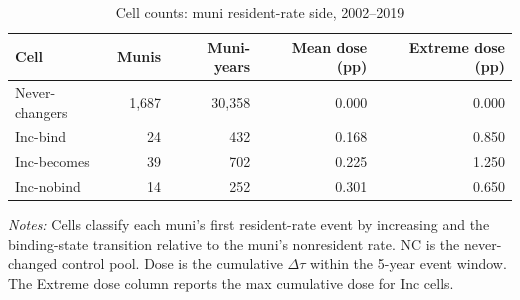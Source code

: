 \begin{table}[H]
  \centering
  \caption{Cell counts: muni resident-rate side, 2002--2019}
  \label{tab:cell_counts_summary}
  \small
  \begin{tabular}{lrrrr}
    \toprule
    Cell & Munis & Muni-years & Mean dose (pp) & Extreme dose (pp) \\
    \midrule
    Never-changers & 1,687 & 30,358 & 0.000 & 0.000 \\
    Inc-bind & 24 & 432 & 0.168 & 0.850 \\
    Inc-becomes & 39 & 702 & 0.225 & 1.250 \\
    Inc-nobind & 14 & 252 & 0.301 & 0.650 \\
    \bottomrule
  \end{tabular}
  \vspace{0.3em}
  \begin{minipage}{0.95\textwidth}
    \footnotesize \textit{Notes:} Cells classify each muni's first resident-rate event by increasing and the binding-state transition relative to the muni's nonresident rate. NC is the never-changed control pool. Dose is the cumulative $\Delta\tau$ within the 5-year event window. The Extreme dose column reports the max cumulative dose for Inc cells.
  \end{minipage}
\end{table}
